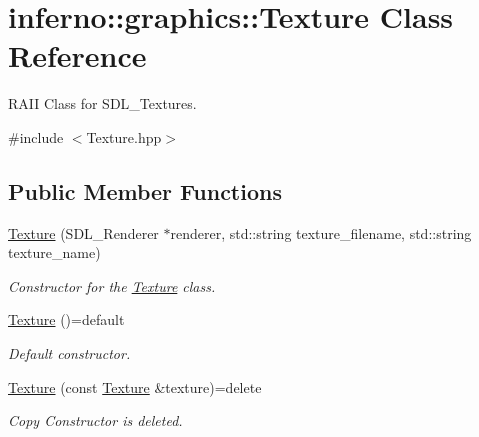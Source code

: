 \hypertarget{classinferno_1_1graphics_1_1_texture}{}\section{inferno\+:\+:graphics\+:\+:Texture Class Reference}
\label{classinferno_1_1graphics_1_1_texture}


R\+A\+II Class for S\+D\+L\+\_\+\+Textures.  




{\ttfamily \#include $<$Texture.\+hpp$>$}

\subsection*{Public Member Functions}
\begin{DoxyCompactItemize}
\item 
\mbox{\hyperlink{classinferno_1_1graphics_1_1_texture_addc70b7b802cc870d9f4647cba3708ac}{Texture}} (S\+D\+L\+\_\+\+Renderer $\ast$renderer, std\+::string texture\+\_\+filename, std\+::string texture\+\_\+name)
\begin{DoxyCompactList}\small\item\em Constructor for the \mbox{\hyperlink{classinferno_1_1graphics_1_1_texture}{Texture}} class. \end{DoxyCompactList}\item 
\mbox{\label{classinferno_1_1graphics_1_1_texture_a41138bbde3b666674d82e710a77ea724}} 
\mbox{\hyperlink{classinferno_1_1graphics_1_1_texture_a41138bbde3b666674d82e710a77ea724}{Texture}} ()=default
\begin{DoxyCompactList}\small\item\em Default constructor. \end{DoxyCompactList}\item 
\mbox{\label{classinferno_1_1graphics_1_1_texture_a052b89675800b158b23321b108a8f2bd}} 
\mbox{\hyperlink{classinferno_1_1graphics_1_1_texture_a052b89675800b158b23321b108a8f2bd}{Texture}} (const \mbox{\hyperlink{classinferno_1_1graphics_1_1_texture}{Texture}} \&texture)=delete
\begin{DoxyCompactList}\small\item\em Copy Constructor is deleted. \end{DoxyCompactList}\item 

\end{DoxyCompactItemize}
